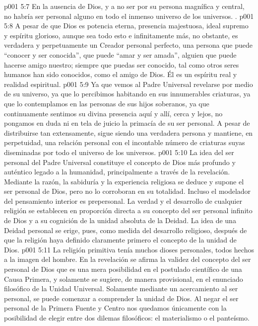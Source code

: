 \vs p001 5:7 \pc En la ausencia de Dios, y a no ser por su persona magnífica y central, no habría ser personal alguno en todo el inmenso universo de los universos. .
\vs p001 5:8 \pc A pesar de que Dios es potencia eterna, presencia majestuosa, ideal supremo y espíritu glorioso, aunque sea todo esto e infinitamente más, no obstante, es verdadera y perpetuamente un Creador personal perfecto, una persona que puede “conocer y ser conocida”, que puede “amar y ser amada”, alguien que puede hacerse amigo nuestro; siempre que puedas ser conocido, tal como otros seres humanos han sido conocidos, como el amigo de Dios. Él es un espíritu real y realidad espiritual.
\vs p001 5:9 Ya que vemos al Padre Universal revelarse por medio de su universo, ya que lo percibimos habitando en sus innumerables criaturas, ya que lo contemplamos en las personas de sus hijos soberanos, ya que continuamente sentimos su divina presencia aquí y allí, cerca y lejos, no pongamos en duda ni en tela de juicio la primacía de su ser personal. A pesar de distribuirse tan extensamente, sigue siendo una verdadera persona y mantiene, en perpetuidad, una relación personal con el incontable número de criaturas suyas diseminadas por todo el universo de los universos.
\vs p001 5:10 \pc La idea del ser personal del Padre Universal constituye el concepto de Dios más profundo y auténtico legado a la humanidad, principalmente a través de la revelación. Mediante la razón, la sabiduría y la experiencia religiosa se deduce y supone el ser personal de Dios, pero no lo corroboran en su totalidad. Incluso el modelador del pensamiento interior es prepersonal. La verdad y el desarrollo de cualquier religión se establecen en proporción directa a su concepto del ser personal infinito de Dios y a su cognición de la unidad absoluta de la Deidad. La idea de una Deidad personal se erige, pues, como medida del desarrollo religioso, después de que la religión haya definido claramente primero el concepto de la unidad de Dios.
\vs p001 5:11 La religión primitiva tenía muchos dioses personales, todos hechos a la imagen del hombre. En la revelación se afirma la validez del concepto del ser personal de Dios que es una mera posibilidad en el postulado científico de una Causa Primera, y solamente se sugiere, de manera provisional, en el enunciado filosófico de la Unidad Universal. Solamente mediante un acercamiento al ser personal, se puede comenzar a comprender la unidad de Dios. Al negar el ser personal de la Primera Fuente y Centro nos quedamos únicamente con la posibilidad de elegir entre dos dilemas filosóficos: el materialismo o el panteísmo.
